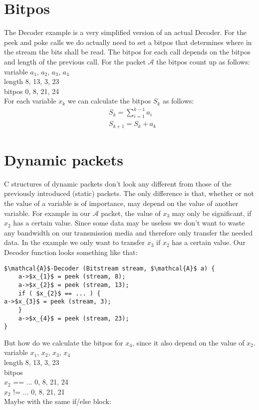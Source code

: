 \documentclass[paper=a4,DIV=12]{scrartcl}
\begin{document}
	\section{Bitpos}
The Decoder example is a very simplified version of an actual Decoder. For the peek and poke calls we do actually need to set a bitpos
that determines where in the stream the bits shall be read. The bitpos for each call depends on the bitpos and length of the previous call.
For the packet $\mathcal{A}$ the bitpos count up as follows:\\
variable   $a_{1}$, $a_{2}$, $a_{3}$, $a_{4}$\\
length      8, 13,  3, 23\\
bitpos      0,  8, 21, 24\\
For each variable $x_{k}$ we can calculate the bitpos $S_{k}$ as follows:
\begin{align*}
	&S_{k} = \sum_{i=1}^{k-1} a_{i}\\
	&S_{k+1} = S_{k} + a_{k}
\end{align*}

\section{Dynamic packets}

C structures of dynamic packets don't look any different from those of the previously introduced (static) packets.
The only difference is that, whether or not the value of a variable is of importance, may depend on the value of another variable.	
For example in our $\mathcal{A}$ packet, the value of $x_{3}$ may only be significant, if $x_{2}$ has a certain value.
Since some data may be useless we don't want to waste any bandwidth on our transmission media and therefore only transfer the needed data.
In the example we only want to transfer $x_{3}$ if $x_{2}$ has a certain value.
Our Decoder function looks something like that:

\begin{lstlisting}[mathescape]
$\mathcal{A}$-Decoder (Bitstream stream, $\mathcal{A}$ a) {
	a->$x_{1}$ = peek (stream, 8);
	a->$x_{2}$ = peek (stream, 13);
	if ( $x_{2}$ == ... ) {
a->$x_{3}$ = peek (stream, 3);
	}
	a->$x_{4}$ = peek (stream, 23);
}
\end{lstlisting}

But how do we calculate the bitpos for $x_{4}$, since it also depend on the value of $x_{2}$.\\
variable   $x_{1}$, $x_{2}$, $x_{3}$, $x_{4}$\\
length        8, 13, 3, 23\\
bitpos\\
$x_{2}$ == ...  0, 8, 21, 24\\
$x_{2}$ != ...  0, 8, 21, 21\\
Maybe with the same if/else block:
\end{document}
